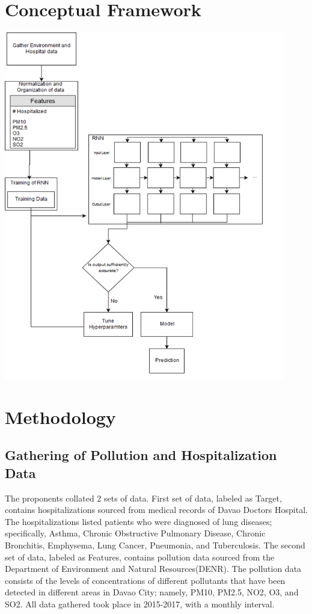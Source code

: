 \documentclass[10pt,11pt,12pt,oneside]{book}
\begin{document}
\section{Conceptual Framework}
\includegraphics[height=6in]{conframework.png}
\section{Methodology}
    \subsection{Gathering of Pollution and Hospitalization Data}
    The proponents collated 2 sets of data. First set of data, labeled as Target, contains hospitalizations sourced from medical records of Davao Doctors Hospital. The hospitalizations listed patients who were diagnosed of lung diseases; specifically, Asthma, Chronic Obstructive Pulmonary Disease, Chronic Bronchitis, Emphysema, Lung Cancer, Pneumonia, and Tuberculosis. The second set of data, labeled as Features, contains pollution data sourced from the Department of Environment and Natural
    Resources(DENR). The pollution data consists of the levels of concentrations of different pollutants that have been detected in different areas in Davao City; namely, PM10, PM2.5, NO2, O3, and SO2. All data gathered took place in 2015-2017, with a monthly interval.
\end{document}
